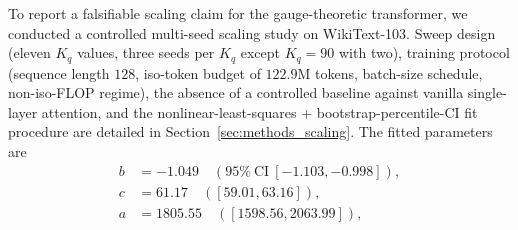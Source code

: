 \documentclass[11pt]{article}
\begin{document}
To report a falsifiable scaling claim for the gauge-theoretic transformer, we conducted a controlled multi-seed scaling study on WikiText-103. Sweep design (eleven $K_q$ values, three seeds per $K_q$ except $K_q = 90$ with two), training protocol (sequence length $128$, iso-token budget of $122.9$M tokens, batch-size schedule, non-iso-FLOP regime), the absence of a controlled baseline against vanilla single-layer attention, and the nonlinear-least-squares + bootstrap-percentile-CI fit procedure are detailed in Section~\ref{sec:methods_scaling}. The fitted parameters are
\begin{align*}
b &= -1.049\quad (95\%\ \text{CI}\ [-1.103, -0.998]), \\
c &= 61.17\quad ([59.01, 63.16]), \\
a &= 1805.55\quad ([1598.56, 2063.99]),
\end{align*}
\end{document}
